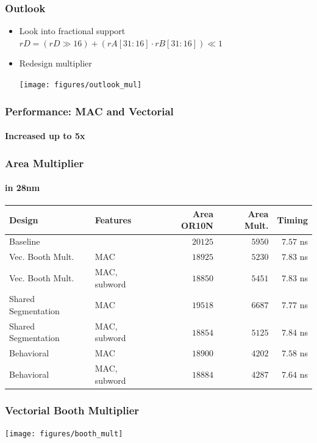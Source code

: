 \documentclass{beamer}
\newcommand{\backupend}{
   \addtocounter{framenumbervorappendix}{-\value{framenumber}}
   \addtocounter{framenumber}{\value{framenumbervorappendix}}
}
\begin{document}
\begin{frame}
  \frametitle{Outlook}
  \begin{itemize}
    \item Look into fractional support \\
      {\color{gray}$rD = (rD \gg 16) + (rA[31:16] \cdot rB[31:16]) \ll 1$}
    \item Redesign multiplier \\
      \vfill
      \begin{center}
        \texttt{[image: figures/outlook\_mul]}
      \end{center}
  \end{itemize}
\end{frame}


\begin{frame}
\frametitle{Performance: MAC and Vectorial}
\framesubtitle{Increased up to 5x}
  \vfill
    \centering
    
  \vfill
\end{frame}

\begin{frame}
  \frametitle{Area Multiplier}
  \framesubtitle{in 28nm}
  \small
  \centering\begin{tabular}{@{}llrrr@{}} \hline
    \textbf{Design}      & \textbf{Features} & \textbf{Area OR10N} & \textbf{Area Mult.} & \textbf{Timing} \\ \hline
    Baseline             &                   &             $20125$ &              $5950$ &       $7.57$ ns \\
    Vec. Booth Mult.     & MAC               &             $18925$ &              $5230$ &       $7.83$ ns \\
    Vec. Booth Mult.     & MAC, subword      &             $18850$ &              $5451$ &       $7.83$ ns \\
    Shared Segmentation  & MAC               &             $19518$ &              $6687$ &       $7.77$ ns \\
    Shared Segmentation  & MAC, subword      &             $18854$ &              $5125$ &       $7.84$ ns \\
    Behavioral           & MAC               &             $18900$ &              $4202$ &       $7.58$ ns \\
    Behavioral           & MAC, subword      &             $18884$ &              $4287$ &       $7.64$ ns \\
    \hline
  \end{tabular}
\end{frame}

\begin{frame}
\frametitle{Vectorial Booth Multiplier}
  \vfill
    \centering
    \centering\texttt{[image: figures/booth\_mult]}
  \vfill
\end{frame}

\backupend

\end{document}
